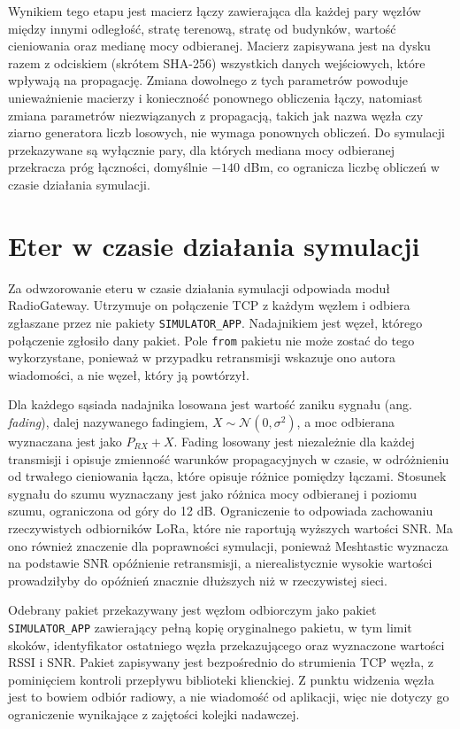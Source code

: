 Wynikiem tego etapu jest macierz łączy zawierająca dla każdej pary węzłów między innymi odległość, stratę terenową, stratę od budynków, wartość cieniowania oraz medianę mocy odbieranej. Macierz zapisywana jest na dysku razem z odciskiem (skrótem SHA-256) wszystkich danych wejściowych, które wpływają na propagację. Zmiana dowolnego z tych parametrów powoduje unieważnienie macierzy i konieczność ponownego obliczenia łączy, natomiast zmiana parametrów niezwiązanych z propagacją, takich jak nazwa węzła czy ziarno generatora liczb losowych, nie wymaga ponownych obliczeń. Do symulacji przekazywane są wyłącznie pary, dla których mediana mocy odbieranej przekracza próg łączności, domyślnie \(-140\) dBm, co ogranicza liczbę obliczeń w czasie działania symulacji.

\section{Eter w czasie działania symulacji}

Za odwzorowanie eteru w czasie działania symulacji odpowiada moduł RadioGateway. Utrzymuje on połączenie TCP z każdym węzłem i odbiera zgłaszane przez nie pakiety \texttt{SIMULATOR\_APP}. Nadajnikiem jest węzeł, którego połączenie zgłosiło dany pakiet. Pole \texttt{from} pakietu nie może zostać do tego wykorzystane, ponieważ w przypadku retransmisji wskazuje ono autora wiadomości, a nie węzeł, który ją powtórzył.

Dla każdego sąsiada nadajnika losowana jest wartość zaniku sygnału (ang. \textit{fading}), dalej nazywanego fadingiem, \(X \sim \mathcal{N}(0, \sigma^2)\), a moc odbierana wyznaczana jest jako \(P_{RX} + X\). Fading losowany jest niezależnie dla każdej transmisji i opisuje zmienność warunków propagacyjnych w czasie, w odróżnieniu od trwałego cieniowania łącza, które opisuje różnice pomiędzy łączami. Stosunek sygnału do szumu wyznaczany jest jako różnica mocy odbieranej i poziomu szumu, ograniczona od góry do 12 dB. Ograniczenie to odpowiada zachowaniu rzeczywistych odbiorników LoRa, które nie raportują wyższych wartości SNR. Ma ono również znaczenie dla poprawności symulacji, ponieważ Meshtastic wyznacza na podstawie SNR opóźnienie retransmisji, a nierealistycznie wysokie wartości prowadziłyby do opóźnień znacznie dłuższych niż w rzeczywistej sieci.

Odebrany pakiet przekazywany jest węzłom odbiorczym jako pakiet \texttt{SIMULATOR\_APP} zawierający pełną kopię oryginalnego pakietu, w tym limit skoków, identyfikator ostatniego węzła przekazującego oraz wyznaczone wartości RSSI i SNR. Pakiet zapisywany jest bezpośrednio do strumienia TCP węzła, z pominięciem kontroli przepływu biblioteki klienckiej. Z punktu widzenia węzła jest to bowiem odbiór radiowy, a nie wiadomość od aplikacji, więc nie dotyczy go ograniczenie wynikające z zajętości kolejki nadawczej.

